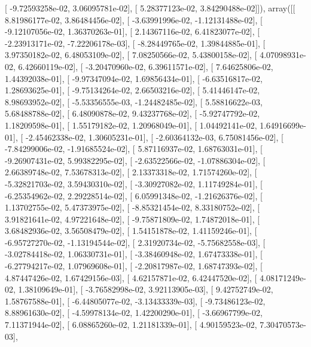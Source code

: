 \documentclass{article}
\begin{document}
       [ -9.72593258e-02,   3.06095781e-02],
       [  5.28377123e-02,   3.84290488e-02]]), array([[  8.81986177e-02,   3.86484456e-02],
       [ -3.63991996e-02,  -1.12131488e-02],
       [ -9.12107056e-02,   1.36370263e-01],
       [  2.14367116e-02,   6.41823077e-02],
       [ -2.23913171e-02,  -7.22206178e-03],
       [ -8.28449765e-02,   1.39844885e-01],
       [  3.97350182e-02,   6.48053109e-02],
       [  7.08250566e-02,   5.43800158e-02],
       [  4.07098931e-02,   6.42660119e-02],
       [ -3.20470960e-02,   6.39611571e-02],
       [  7.64625806e-02,   1.44392038e-01],
       [ -9.97347094e-02,   1.69856434e-01],
       [ -6.63516817e-02,   1.28693625e-01],
       [ -9.75134264e-02,   2.66503216e-02],
       [  5.41446147e-02,   8.98693952e-02],
       [ -5.53356555e-03,  -1.24482485e-02],
       [  5.58816622e-03,   5.68488788e-02],
       [  6.48090878e-02,   9.43237768e-02],
       [ -5.92747792e-02,   1.18209598e-01],
       [  1.55179182e-02,   1.20968049e-01],
       [  1.04492141e-02,   1.64916699e-01],
       [ -2.45462338e-02,   1.30605231e-01],
       [ -2.60364132e-03,   6.75081456e-02],
       [ -7.84299006e-02,  -1.91685524e-02],
       [  5.87116937e-02,   1.68763031e-01],
       [ -9.26907431e-02,   5.99382295e-02],
       [ -2.63522566e-02,  -1.07886304e-02],
       [  2.66389748e-02,   7.53678313e-02],
       [  2.13373318e-02,   1.71574260e-02],
       [ -5.32821703e-02,   3.59430310e-02],
       [ -3.30927082e-02,   1.11749284e-01],
       [ -6.25354962e-02,   2.29228514e-02],
       [  6.05991348e-02,  -1.21626376e-02],
       [  1.13702755e-02,   5.47373975e-02],
       [ -8.85321454e-02,   8.33180752e-02],
       [  3.91821641e-02,   4.97221648e-02],
       [ -9.75871809e-02,   1.74872018e-01],
       [  3.68482936e-02,   3.56508479e-02],
       [  1.54151878e-02,   1.41159246e-01],
       [ -6.95727270e-02,  -1.13194544e-02],
       [  2.31920734e-02,  -5.75682558e-03],
       [ -3.02784418e-02,   1.06330731e-01],
       [ -3.38460948e-02,   1.67473338e-01],
       [ -6.27794217e-02,   1.07969608e-01],
       [ -2.20817987e-02,   1.68747393e-02],
       [  4.87447426e-02,   1.67429156e-03],
       [  4.62157871e-02,   6.42447520e-02],
       [  4.08171249e-02,   1.38109649e-01],
       [ -3.76582998e-02,   3.92113905e-03],
       [  9.42752749e-02,   1.58767588e-01],
       [ -6.44805077e-02,  -3.13433339e-03],
       [ -9.73486123e-02,   8.88961630e-02],
       [ -4.59978134e-02,   1.42200290e-01],
       [ -3.66967799e-02,   7.11371944e-02],
       [  6.08865260e-02,   1.21181339e-01],
       [  4.90159523e-02,   7.30470573e-03],
\end{document}
